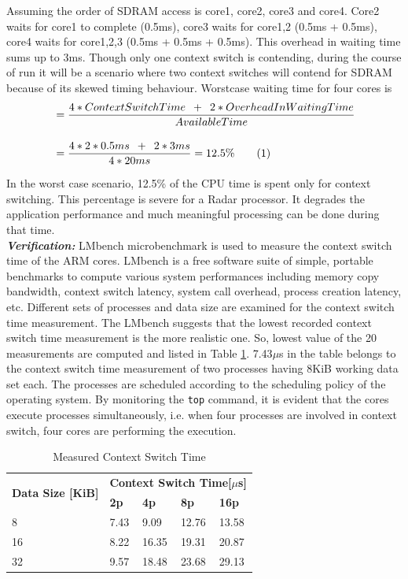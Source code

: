 Assuming the order of SDRAM access is core1, core2, core3 and core4. Core2 waits for core1 to complete (0.5ms), core3 waits for core1,2 (0.5ms + 0.5ms), core4 waits for core1,2,3 (0.5ms + 0.5ms + 0.5ms). This overhead in waiting time sums up to 3ms. Though only one context switch is contending, during the course of run it will be a scenario where two context switches will contend for SDRAM because of its skewed timing behaviour. Worstcase waiting time for four cores is 
\begin{align*}
	& = \frac{4*ContextSwitchTime \enspace + \enspace 2*OverheadInWaitingTime}{AvailableTime} \\[0.4cm]
	& = \frac{4*2*0.5ms \enspace + \enspace 2*3ms}{4*20ms} = 12.5\% \stepcounter{equation}\tag{\theequation} 
\end{align*}

In the worst case scenario, 12.5\% of the CPU time is spent only for context switching. This percentage is severe for a Radar processor. It degrades the application performance and much meaningful processing can be done during that time. \\

\textbf{\textsl{Verification:}} LMbench microbenchmark\cite{lmbench} is used to measure the context switch time of the ARM cores. LMbench is a free software suite of simple, portable benchmarks to compute various system performances including memory copy bandwidth, context switch latency, system call overhead, process creation latency, etc. Different sets of processes and data size are examined for the context switch time measurement. The LMbench suggests that the lowest recorded context switch time measurement is the more realistic one. So, lowest value of the 20 measurements are computed and listed in Table \ref{mm:ctxsw:lmbench}. 7.43$\mu$s in the table belongs to the context switch time measurement of two processes having 8KiB working data set each. The processes are scheduled according to the scheduling policy of the operating system. By monitoring the \verb|top| command, it is evident that the cores execute processes simultaneously, i.e. when four processes are involved in context switch, four cores are performing the execution.

\begin{table}[h!]
	\begin{tabularx}{\textwidth}{|X|X|X|X|X|}
		\hline
		\multirow{2}{*}{\textbf{Data Size [KiB]}} & \multicolumn{4}{c|}{\textbf{Context Switch Time[\boldmath$\mu$s]}} \\ \cline{2-5}
		& \textbf{2p} & \textbf{4p} & \textbf{8p} & \textbf{16p}  \\ \hline 
		8 & 7.43 & 9.09 & 12.76 & 13.58 \\ \hline
		16 & 8.22 & 16.35 & 19.31 & 20.87 \\ \hline
		32 & 9.57 & 18.48 & 23.68 & 29.13 \\ \hline
	\end{tabularx}
\caption{Measured Context Switch Time}
\label{mm:ctxsw:lmbench}
\end{table}

